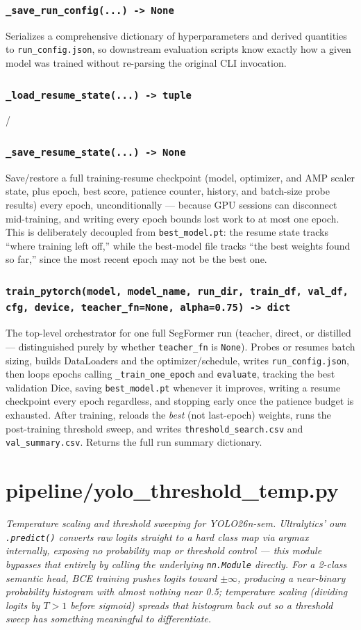 \documentclass[11pt]{article}
\newcommand{\role}[1]{\par\noindent\textit{#1}\par\vspace{0.5em}}
\newcommand{\func}[1]{\subsubsection*{\texttt{#1}}}
\begin{document}
\func{\_save\_run\_config(...) -> None}
Serializes a comprehensive dictionary of hyperparameters and derived quantities
to \texttt{run\_config.json}, so downstream evaluation scripts know exactly how
a given model was trained without re-parsing the original CLI invocation.

\func{\_load\_resume\_state(...) -> tuple} / \func{\_save\_resume\_state(...) -> None}
Save/restore a full training-resume checkpoint (model, optimizer, and AMP
scaler state, plus epoch, best score, patience counter, history, and batch-size
probe results) every epoch, unconditionally --- because GPU sessions can
disconnect mid-training, and writing every epoch bounds lost work to at most
one epoch. This is deliberately decoupled from \texttt{best\_model.pt}: the
resume state tracks ``where training left off,'' while the best-model file
tracks ``the best weights found so far,'' since the most recent epoch may not
be the best one.

\func{train\_pytorch(model, model\_name, run\_dir, train\_df, val\_df, cfg, device, teacher\_fn=None, alpha=0.75) -> dict}
The top-level orchestrator for one full SegFormer run (teacher, direct, or
distilled --- distinguished purely by whether \texttt{teacher\_fn} is
\texttt{None}). Probes or resumes batch sizing, builds DataLoaders and the
optimizer/schedule, writes \texttt{run\_config.json}, then loops epochs calling
\texttt{\_train\_one\_epoch} and \texttt{evaluate}, tracking the best validation
Dice, saving \texttt{best\_model.pt} whenever it improves, writing a resume
checkpoint every epoch regardless, and stopping early once the patience budget
is exhausted. After training, reloads the \emph{best} (not last-epoch) weights,
runs the post-training threshold sweep, and writes \texttt{threshold\_search.csv}
and \texttt{val\_summary.csv}. Returns the full run summary dictionary.

\newpage
\section{pipeline/yolo\_threshold\_temp.py}
\role{Temperature scaling and threshold sweeping for YOLO26n-sem. Ultralytics'
own \texttt{.predict()} converts raw logits straight to a hard class map via
argmax internally, exposing no probability map or threshold control --- this
module bypasses that entirely by calling the underlying \texttt{nn.Module}
directly. For a 2-class semantic head, BCE training pushes logits toward
$\pm\infty$, producing a near-binary probability histogram with almost nothing
near 0.5; temperature scaling (dividing logits by $T>1$ before sigmoid) spreads
that histogram back out so a threshold sweep has something meaningful to
differentiate.}
\end{document}

